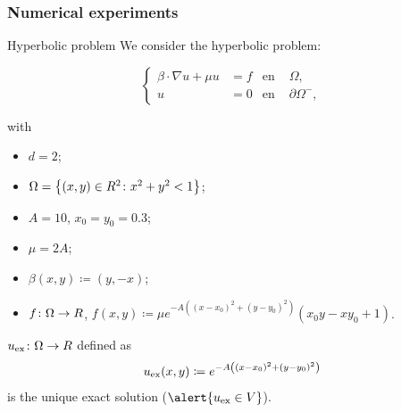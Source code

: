 	\subsubsection{Numerical experiments}
	\begin{frame}{Hyperbolic problem}
		\scriptsize
		We consider the hyperbolic problem:
		\begin{block}{}
		\begin{equation*}
		\left\{
		\begin{aligned}
		\beta\cdot\nabla u+\mu u&=f & \text{en } &\Omega, \\
		u&=0 & \text{en } &\partial\Omega^-,
		\end{aligned}
		\right.
		\end{equation*}
		\end{block}
		with
		\begin{itemize}
			\item $d=2$;
			\item $\Omega=\left\{(x,y)\in\relax R^2\colon x^2+y^2<1 \right\}$;
			\item $A=10$, $x_0=y_0=0.3$;
			\item $\mu=2A$;
			\item $\beta(x,y)\coloneqq(y,-x)$;
			\item $f\colon\Omega\to\relax R$, $f(x,y)\coloneqq \mu e^{-A\left((x-x_0)^2+(y-y_0)^2\right)}(x_0 y -x y_0 + 1)$.
		\end{itemize}
		
		\vspace*{0.3cm}
		$u_{\text{ex}}\colon\Omega\to\relax R$ defined as
		\begin{equation*}
		u_{\text{ex}} (x,y)\coloneqq e^{-A\left((x-x_0)^2+(y-y_0)^2\right)}
		\end{equation*}
		is the \alert{unique exact solution} ($\alert{u_\text{ex}\in V}$).
		
		\end{frame}
		

